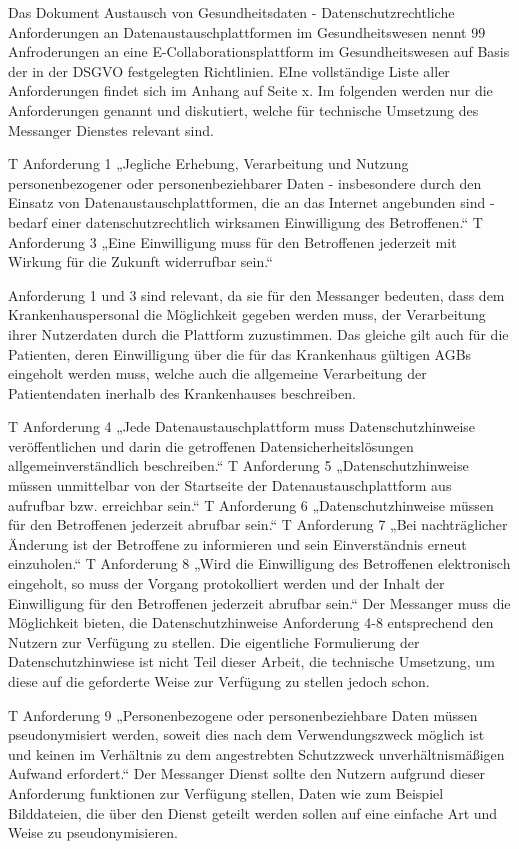 Das Dokument Austausch von Gesundheitsdaten - Datenschutzrechtliche Anforderungen an Datenaustauschplattformen im Gesundheitswesen nennt 99 Anfroderungen an eine E-Collaborationsplattform im Gesundheitswesen auf Basis der in der DSGVO festgelegten Richtlinien. EIne vollständige Liste aller Anforderungen findet sich im Anhang auf Seite x. Im folgenden werden nur die Anforderungen genannt und diskutiert, welche für technische Umsetzung des Messanger Dienstes relevant sind.


T Anforderung 1
„Jegliche Erhebung, Verarbeitung und Nutzung personenbezogener oder personenbeziehbarer Daten - insbesondere durch den Einsatz von Datenaustauschplattformen, die an das Internet angebunden sind - bedarf einer datenschutzrechtlich wirksamen Einwilligung des Betroffenen.“
T Anforderung 3
„Eine Einwilligung muss für den Betroffenen jederzeit mit Wirkung für die Zukunft widerrufbar sein.“

Anforderung 1 und 3 sind relevant, da sie für den Messanger bedeuten, dass dem Krankenhauspersonal die Möglichkeit gegeben werden muss, der Verarbeitung ihrer Nutzerdaten durch die Plattform zuzustimmen. Das gleiche gilt auch für die Patienten, deren Einwilligung über die für das Krankenhaus gültigen AGBs eingeholt werden muss, welche auch die allgemeine Verarbeitung der Patientendaten inerhalb des Krankenhauses beschreiben.


T Anforderung 4
„Jede Datenaustauschplattform muss Datenschutzhinweise veröffentlichen und darin die getroffenen Datensicherheitslösungen allgemeinverständlich beschreiben.“
T Anforderung 5
„Datenschutzhinweise müssen unmittelbar von der Startseite der Datenaustauschplattform aus aufrufbar bzw. erreichbar sein.“
T Anforderung 6
„Datenschutzhinweise müssen für den Betroffenen jederzeit abrufbar sein.“
T Anforderung 7
„Bei nachträglicher Änderung ist der Betroffene zu informieren und sein Einverständnis erneut einzuholen.“
T Anforderung 8
„Wird die Einwilligung des Betroffenen elektronisch eingeholt, so muss der Vorgang protokolliert werden und der Inhalt der Einwilligung für den Betroffenen jederzeit abrufbar sein.“
Der Messanger muss die Möglichkeit bieten, die Datenschutzhinweise Anforderung 4-8 entsprechend den Nutzern zur Verfügung zu stellen.
Die eigentliche Formulierung der Datenschutzhinwiese ist nicht Teil dieser Arbeit, die technische Umsetzung, um diese auf die geforderte Weise zur Verfügung zu stellen jedoch schon.

T Anforderung 9
„Personenbezogene oder personenbeziehbare Daten müssen pseudonymisiert werden, soweit dies nach dem Verwendungszweck möglich ist und keinen im Verhältnis zu dem angestrebten Schutzzweck unverhältnismäßigen Aufwand erfordert.“
Der Messanger Dienst sollte den Nutzern aufgrund dieser Anforderung funktionen zur Verfügung stellen, Daten wie zum Beispiel Bilddateien, die über den Dienst geteilt werden sollen auf eine einfache Art und Weise zu pseudonymisieren.

